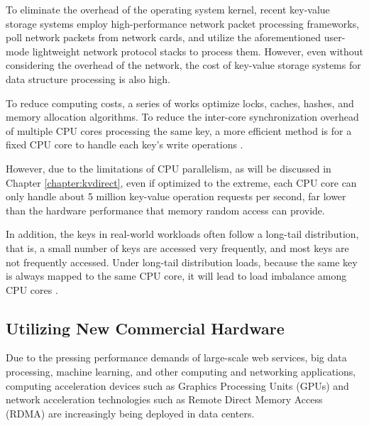 To eliminate the overhead of the operating system kernel, recent key-value storage systems \cite {kapoor2012chronos,ousterhout2010case,ousterhout2015ramcloud,lim2014mica,li2016full} employ high-performance network packet processing frameworks, poll network packets from network cards, and utilize the aforementioned user-mode lightweight network protocol stacks to process them. However, even without considering the overhead of the network, the cost of key-value storage systems for data structure processing is also high. 

To reduce computing costs, a series of works \cite{mao2012cache,fan2013memc3,li2014algorithmic} optimize locks, caches, hashes, and memory allocation algorithms. To reduce the inter-core synchronization overhead of multiple CPU cores processing the same key, a more efficient method is for a fixed CPU core to handle each key's write operations \cite{lim2014mica}. 

However, due to the limitations of CPU parallelism, as will be discussed in Chapter \ref{chapter:kvdirect}, even if optimized to the extreme, each CPU core can only handle about 5 million key-value operation requests per second, far lower than the hardware performance that memory random access can provide. 

In addition, the keys in real-world workloads often follow a long-tail distribution, that is, a small number of keys are accessed very frequently, and most keys are not frequently accessed. Under long-tail distribution loads, because the same key is always mapped to the same CPU core, it will lead to load imbalance among CPU cores \cite{lim2014mica}.

\subsection{Utilizing New Commercial Hardware}

Due to the pressing performance demands of large-scale web services, big data processing, machine learning, and other computing and networking applications, computing acceleration devices such as Graphics Processing Units (GPUs) and network acceleration technologies such as Remote Direct Memory Access (RDMA) \cite{infiniband2000infiniband} are increasingly being deployed in data centers.

